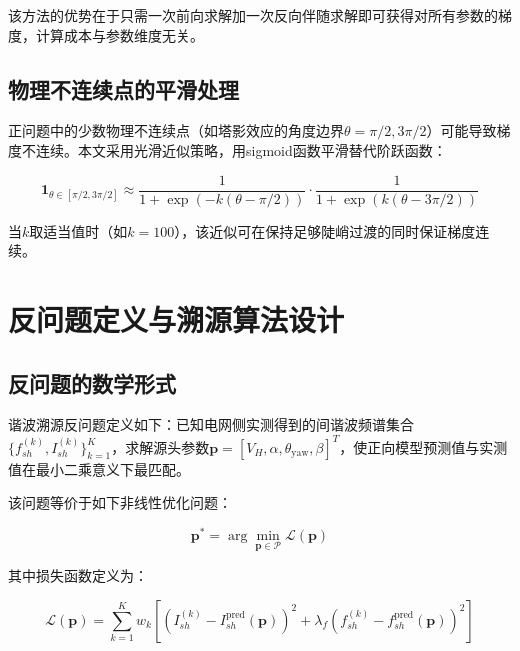 \documentclass[withoutpreface,bwprint]{cumcmthesis}
\begin{document}
该方法的优势在于只需一次前向求解加一次反向伴随求解即可获得对所有参数的梯度，计算成本与参数维度无关。

\subsection{物理不连续点的平滑处理}

正问题中的少数物理不连续点（如塔影效应的角度边界$\theta=\pi/2,3\pi/2$）可能导致梯度不连续。本文采用光滑近似策略，用sigmoid函数平滑替代阶跃函数：

\begin{equation}
\mathbf{1}_{\theta\in[\pi/2,3\pi/2]} \approx \frac{1}{1+\exp(-k(\theta-\pi/2))}\cdot\frac{1}{1+\exp(k(\theta-3\pi/2))}
\label{eq:smooth_step}
\end{equation}

当$k$取适当值时（如$k=100$），该近似可在保持足够陡峭过渡的同时保证梯度连续。

\section{反问题定义与溯源算法设计}

\subsection{反问题的数学形式}

谐波溯源反问题定义如下：已知电网侧实测得到的间谐波频谱集合$\{f_{sh}^{(k)}, I_{sh}^{(k)}\}_{k=1}^K$，求解源头参数$\mathbf{p}=[V_H,\alpha,\theta_{\mathrm{yaw}},\beta]^T$，使正向模型预测值与实测值在最小二乘意义下最匹配。

该问题等价于如下非线性优化问题：

\begin{equation}
\mathbf{p}^* = \arg\min_{\mathbf{p}\in\mathcal{P}} \mathcal{L}(\mathbf{p})
\label{eq:optimization}
\end{equation}

其中损失函数定义为：

\begin{equation}
\mathcal{L}(\mathbf{p}) = \sum_{k=1}^K w_k\left[\left(I_{sh}^{(k)} - I_{sh}^{\mathrm{pred}}(\mathbf{p})\right)^2 + \lambda_f\left(f_{sh}^{(k)} - f_{sh}^{\mathrm{pred}}(\mathbf{p})\right)^2\right]
\label{eq:loss}
\end{equation}
\end{document}
